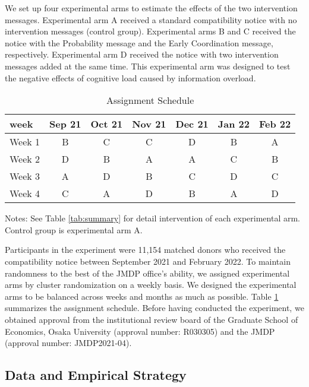\documentclass[
  11pt,
  a4paper
]{article}
\begin{document}
We set up four experimental arms to estimate the effects of the two intervention messages. Experimental arm A received a standard compatibility notice with no intervention messages (control group). Experimental arms B and C received the notice with the Probability message and the Early Coordination message, respectively. Experimental arm D received the notice with two intervention messages added at the same time. This experimental arm was designed to test the negative effects of cognitive load caused by information overload.

\begin{table}

\caption{\label{tab:assignment}Assignment Schedule}
\centering
\fontsize{9}{11}\selectfont
\fontsize{9}{11}\selectfont
\begin{threeparttable}
\begin{tabular}[t]{lcccccc}
\toprule
week & Sep 21 & Oct 21 & Nov 21 & Dec 21 & Jan 22 & Feb 22\\
\midrule
Week 1 & B & C & C & D & B & A\\
Week 2 & D & B & A & A & C & B\\
Week 3 & A & D & B & C & D & C\\
Week 4 & C & A & D & B & A & D\\
\bottomrule
\end{tabular}
\begin{tablenotes}
\item Notes: See Table \ref{tab:summary} for detail intervention of each experimental arm. Control group is experimental arm A.
\end{tablenotes}
\end{threeparttable}
\end{table}

Participants in the experiment were 11,154 matched donors who received the compatibility notice between September 2021 and February 2022. To maintain randomness to the best of the JMDP office's ability, we assigned experimental arms by cluster randomization on a weekly basis. We designed the experimental arms to be balanced across weeks and months as much as possible. Table \ref{tab:assignment} summarizes the assignment schedule. Before having conducted the experiment, we obtained approval from the institutional review board of the Graduate School of Economics, Osaka University (approval number: R030305) and the JMDP (approval number: JMDP2021-04).

\hypertarget{data-and-empirical-strategy}{%
\subsection{Data and Empirical Strategy}\label{data-and-empirical-strategy}}
\end{document}
